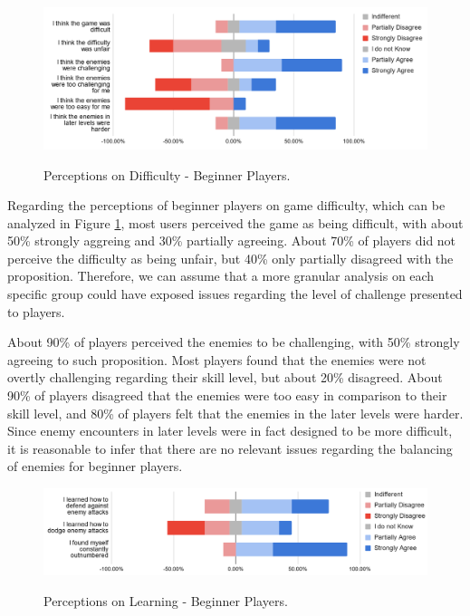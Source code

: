 \begin{figure}[ht]
    \begin{center}
    \caption{Perceptions on Difficulty - Beginner Players.}
        \includegraphics[width=36em]{figures/fig-perception-difficulty-beginner-players.png}
        \label{fig:perception-difficulty-beginner-players}
    \end{center}
\end{figure}

Regarding the perceptions of beginner players on game difficulty, which can be analyzed in Figure \ref{fig:perception-difficulty-beginner-players}, most users perceived the game as being difficult, with about 50\% strongly aggreing and 30\% partially agreeing. About 70\% of players did not perceive the difficulty as being unfair, but 40\% only partially disagreed with the proposition. Therefore, we can assume that a more granular analysis on each specific group could have exposed issues regarding the level of challenge presented to players.

About 90\% of players perceived the enemies to be challenging, with 50\% strongly agreeing to such proposition. Most players found that the enemies were not overtly challenging regarding their skill level, but about 20\% disagreed. About 90\% of players disagreed that the enemies were too easy in comparison to their skill level, and 80\% of players felt that the enemies in the later levels were harder. Since enemy encounters in later levels were in fact designed to be more difficult, it is reasonable to infer that there are no relevant issues regarding the balancing of enemies for beginner players. 

\begin{figure}[ht]
    \begin{center}
    \caption{Perceptions on Learning - Beginner Players.}
        \includegraphics[width=36em]{figures/fig-perception-learning-beginner-players.png}
        \label{fig:perception-learning-beginner-players}
    \end{center}
\end{figure}

